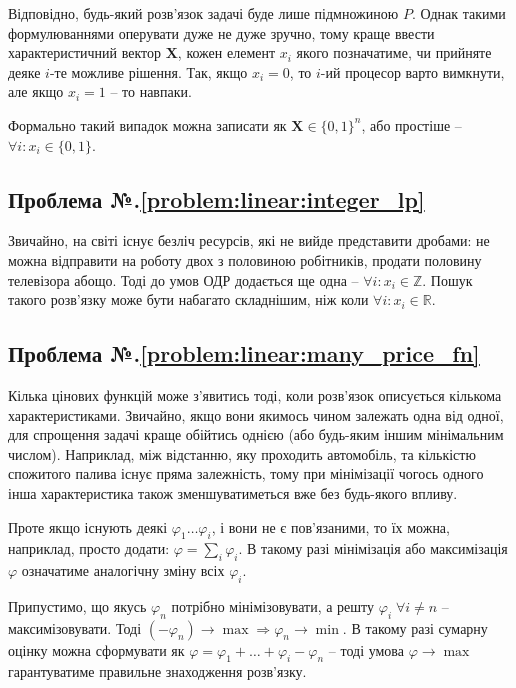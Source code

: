 \documentclass[\main/book.tex]{subfiles}
\begin{document}
Відповідно, будь-який розв'язок задачі буде лише підмножиною $P$. Однак такими формулюваннями оперувати дуже не дуже зручно, тому краще ввести характеристичний вектор $\mathbf{X}$, кожен елемент $x_i$ якого позначатиме, чи прийняте деяке $i$-те можливе рішення. Так, якщо $x_i=0$, то $i$-ий процесор варто вимкнути, але якщо $x_i=1$ -- то навпаки.

\begin{note}
 Формально такий випадок можна записати як $\mathbf{X} \in \{0, 1\}^{n}$, або простіше -- $\forall i: x_i \in \{0, 1\}$.
\end{note}

\clearpage
{}

\subsection*{Проблема №.\ref{problem:linear:integer_lp}}

Звичайно, на світі існує безліч ресурсів, які не вийде представити дробами: не можна відправити на роботу двох з половиною робітників, продати половину телевізора абощо. Тоді до умов ОДР додається ще одна -- $\forall i: x_i \in \mathbb{Z}$. Пошук такого розв'язку може бути набагато складнішим, ніж коли $\forall i: x_i \in \mathbb{R}$.

\subsection*{Проблема №.\ref{problem:linear:many_price_fn}}

Кілька цінових функцій може з'явитись тоді, коли розв'язок описується кількома характеристиками. Звичайно, якщо вони якимось чином залежать одна від одної, для спрощення задачі краще обійтись однією (або будь-яким іншим мінімальним числом). Наприклад, між відстанню, яку проходить автомобіль, та кількістю спожитого палива існує пряма залежність, тому при мінімізації чогось одного інша характеристика також зменшуватиметься вже без будь-якого впливу.

Проте якщо існують деякі $\varphi_1 \ldots \varphi_i$, і вони не є пов'язаними, то їх можна, наприклад, просто додати: $\varphi = \sum_i \varphi_i$. В такому разі мінімізація або максимізація $\varphi$ означатиме аналогічну зміну всіх $\varphi_i$.

Припустимо, що якусь $\varphi_n$ потрібно мінімізовувати, а решту $\varphi_i \; \forall {i \neq n}$ -- максимізовувати. Тоді $(-\varphi_n) \rightarrow \max \Rightarrow \varphi_n \rightarrow \min$. В такому разі сумарну оцінку можна сформувати як $\varphi = \varphi_1 + \ldots + \varphi_i - \varphi_n$ -- тоді умова $\varphi \rightarrow \max$ гарантуватиме правильне знаходження розв'язку.
\end{document}
